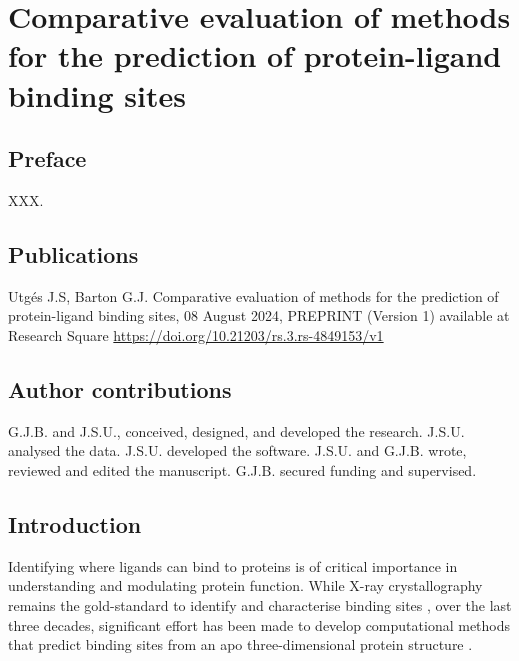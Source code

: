 \chapter{Comparative evaluation of methods for the prediction of protein-ligand binding sites}

\section*{Preface}

XXX.

\section*{Publications}

Utgés J.S, Barton G.J. Comparative evaluation of methods for the prediction of protein-ligand binding sites, 08 August 2024, PREPRINT (Version 1) available at Research Square \url{https://doi.org/10.21203/rs.3.rs-4849153/v1}

\section*{Author contributions}

G.J.B. and J.S.U., conceived, designed, and developed the research. J.S.U. analysed the data. J.S.U. developed the software. J.S.U. and G.J.B. wrote, reviewed and edited the manuscript. G.J.B. secured funding and supervised.

\section{Introduction}

Identifying where ligands can bind to proteins is of critical importance in understanding and modulating protein function. While X-ray crystallography remains the gold-standard to identify and characterise binding sites \cite{CONGREVE_2003_RO3, REES_2004_FBLD, MURRAY_2009_FBDD, SCHIEBEL_2016_FRAGMENTS, UTGES_2024_FRAGSYS}, over the last three decades, significant  effort has been made to develop computational methods that predict binding sites from an apo three-dimensional protein structure \cite{VOLKAMER_2010_TOPOLOGY}.

